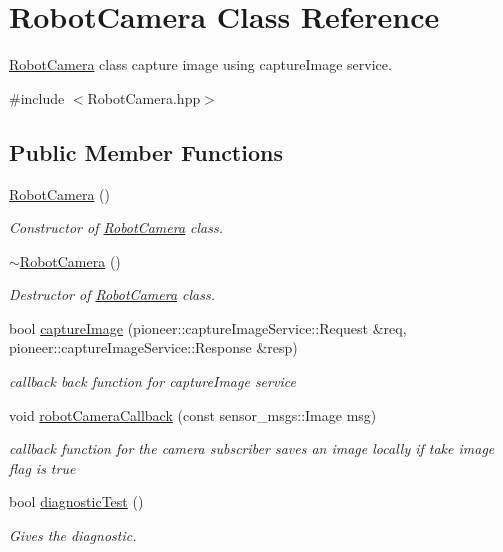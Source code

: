 \hypertarget{class_robot_camera}{}\section{Robot\+Camera Class Reference}
\label{class_robot_camera}


\hyperlink{class_robot_camera}{Robot\+Camera} class capture image using capture\+Image service.  




{\ttfamily \#include $<$Robot\+Camera.\+hpp$>$}

\subsection*{Public Member Functions}
\begin{DoxyCompactItemize}
\item 
\hyperlink{class_robot_camera_aa32b645d4fe1d6fc7a550166a3878536}{Robot\+Camera} ()
\begin{DoxyCompactList}\small\item\em Constructor of \hyperlink{class_robot_camera}{Robot\+Camera} class. \end{DoxyCompactList}\item 
\hyperlink{class_robot_camera_ab7ee19c6d8348c8b54dd50aaebcf9b48}{$\sim$\+Robot\+Camera} ()
\begin{DoxyCompactList}\small\item\em Destructor of \hyperlink{class_robot_camera}{Robot\+Camera} class. \end{DoxyCompactList}\item 
bool \hyperlink{class_robot_camera_afcdd096a861e94fa31cf566d77dac8e9}{capture\+Image} (pioneer\+::capture\+Image\+Service\+::\+Request \&req, pioneer\+::capture\+Image\+Service\+::\+Response \&resp)
\begin{DoxyCompactList}\small\item\em callback back function for capture\+Image service \end{DoxyCompactList}\item 
void \hyperlink{class_robot_camera_ab9dcbfebcd940cc058f14c753d084702}{robot\+Camera\+Callback} (const sensor\+\_\+msgs\+::\+Image msg)
\begin{DoxyCompactList}\small\item\em callback function for the camera subscriber saves an image locally if take image flag is true \end{DoxyCompactList}\item 
bool \hyperlink{class_robot_camera_aaec15fb8711b5540f5ef488fe88dea61}{diagnostic\+Test} ()
\begin{DoxyCompactList}\small\item\em Gives the diagnostic. \end{DoxyCompactList}\end{DoxyCompactItemize}


